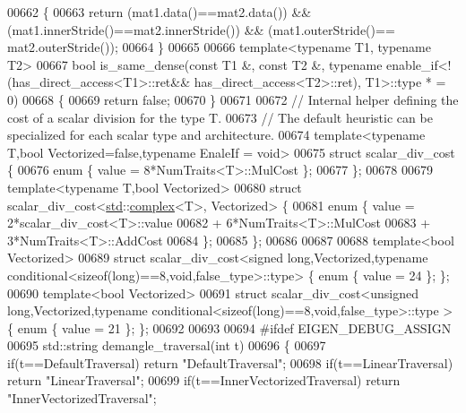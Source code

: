 \begin{DoxyCode}
{00662 \{
00663   \textcolor{keywordflow}{return} (mat1.data()==mat2.data()) && (mat1.innerStride()==mat2.innerStride()) && (mat1.outerStride()==
      mat2.outerStride());
00664 \}
00665 
00666 \textcolor{keyword}{template}<\textcolor{keyword}{typename} T1, \textcolor{keyword}{typename} T2>
00667 \textcolor{keywordtype}{bool} is\_same\_dense(\textcolor{keyword}{const} T1 &, \textcolor{keyword}{const} T2 &, \textcolor{keyword}{typename} enable\_if<!(has\_direct\_access<T1>::ret&&
      has\_direct\_access<T2>::ret), T1>::type * = 0)
00668 \{
00669   \textcolor{keywordflow}{return} \textcolor{keyword}{false};
00670 \}
00671 
00672 \textcolor{comment}{// Internal helper defining the cost of a scalar division for the type T.}
00673 \textcolor{comment}{// The default heuristic can be specialized for each scalar type and architecture.}
00674 \textcolor{keyword}{template}<\textcolor{keyword}{typename} T,\textcolor{keywordtype}{bool} Vectorized=false,\textcolor{keyword}{typename} EnaleIf = \textcolor{keywordtype}{void}>
00675 \textcolor{keyword}{struct }scalar\_div\_cost \{
00676   \textcolor{keyword}{enum} \{ value = 8*NumTraits<T>::MulCost \};
00677 \};
00678 
00679 \textcolor{keyword}{template}<\textcolor{keyword}{typename} T,\textcolor{keywordtype}{bool} Vectorized>
00680 \textcolor{keyword}{struct }scalar\_div\_cost<\hyperlink{namespacestd}{std}::\hyperlink{structcomplex}{complex}<T>, Vectorized> \{
00681   \textcolor{keyword}{enum} \{ value = 2*scalar\_div\_cost<T>::value
00682                + 6*NumTraits<T>::MulCost
00683                + 3*NumTraits<T>::AddCost
00684   \};
00685 \};
00686 
00687 
00688 \textcolor{keyword}{template}<\textcolor{keywordtype}{bool} Vectorized>
00689 \textcolor{keyword}{struct }scalar\_div\_cost<signed long,Vectorized,typename conditional<sizeof(long)==8,void,false\_type>::type> 
      \{ \textcolor{keyword}{enum} \{ value = 24 \}; \};
00690 \textcolor{keyword}{template}<\textcolor{keywordtype}{bool} Vectorized>
00691 \textcolor{keyword}{struct }scalar\_div\_cost<unsigned long,Vectorized,typename conditional<sizeof(long)==8,void,false\_type>::type
      > \{ \textcolor{keyword}{enum} \{ value = 21 \}; \};
00692 
00693 
00694 \textcolor{preprocessor}{#ifdef EIGEN\_DEBUG\_ASSIGN}
00695 std::string demangle\_traversal(\textcolor{keywordtype}{int} t)
00696 \{
00697   \textcolor{keywordflow}{if}(t==DefaultTraversal) \textcolor{keywordflow}{return} \textcolor{stringliteral}{"DefaultTraversal"};
00698   \textcolor{keywordflow}{if}(t==LinearTraversal) \textcolor{keywordflow}{return} \textcolor{stringliteral}{"LinearTraversal"};
00699   \textcolor{keywordflow}{if}(t==InnerVectorizedTraversal) \textcolor{keywordflow}{return} \textcolor{stringliteral}{"InnerVectorizedTraversal"};
}
\end{DoxyCode}
